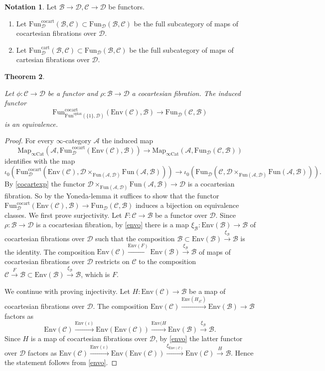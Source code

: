 \documentclass[10pt,oneside]{article}
\numberwithin{equation}{section} %
\numberwithin{figure}{section} %
\theoremstyle{plain}
\newtheorem{theorem}{Theorem}[subsection]
\theoremstyle{definition}
\newtheorem{notation}[theorem]{Notation}
\newcommand{\mA}{{\mathcal A}}
\newcommand{\mB}{{\mathcal B}}
\newcommand{\mC}{{\mathcal C}}
\newcommand{\mD}{{\mathcal D}}
\newcommand{\Env}{{\mathrm{Env}}}
\newcommand{\Cat}{\mathrm{Cat}}
\newcommand{\Fun}{\mathrm{Fun}}
\newcommand{\cocart}{{\mathrm{cocart}}}
\newcommand{\cart}{{\mathrm{cart}}}
\newcommand{\oplax}{{\mathrm{oplax}}}
\newcommand{\Map}{{\mathrm{Map}}}
\begin{document}
\begin{notation}

Let $\mB \to \mD, \mC \to \mD$ be functors.
\begin{enumerate}[\normalfont(1)]\setlength{\itemsep}{-2pt}

\item Let $\Fun_\mD^\cocart(\mB,\mC) \subset \Fun_\mD(\mB,\mC) $
be the full subcategory of maps of cocartesian fibrations over $\mD.$

\item Let $\Fun_\mD^\cart(\mB,\mC) \subset \Fun_\mD(\mB,\mC) $
be the full subcategory of maps of cartesian fibrations over $\mD.$

\end{enumerate}

\end{notation}

\begin{theorem}\label{envelo}

Let $\phi: \mC \to \mD $ be a functor and
$\rho: \mB \to \mD $ a cocartesian fibration.
The induced functor
$$ \Fun^\cocart_{\Fun^\oplax(\{1\},\mD)}(\Env(\mC),\mB) \to \Fun_\mD(\mC,\mB) $$
is an equivalence.

\end{theorem}

\begin{proof}

For every $\infty$-category $\mA$ the induced map
$$ \Map_{\infty\Cat}(\mA,\Fun^{\cocart}_\mD(\Env(\mC),\mB)) \to \Map_{\infty\Cat}(\mA, \Fun_\mD(\mC,\mB))$$ identifies with the map
$$ \iota_0(\Fun^{\cocart}_\mD(\Env(\mC), \mD \times_{\Fun(\mA,\mD)}\Fun(\mA,\mB))) \to \iota_0(\Fun_\mD(\mC,\mD \times_{\Fun(\mA,\mD)}\Fun(\mA,\mB))).$$
By \cref{cocartexp} the functor $\mD \times_{\Fun(\mA,\mD)}\Fun(\mA,\mB) \to \mD$ is a cocartesian fibration.
So by the Yoneda-lemma it suffices to show that 
the functor $ \Fun^\cocart_\mD(\Env(\mC),\mB) \to \Fun_\mD(\mC,\mB) $ induces a bijection on equivalence classes.
We first prove surjectivity.
Let $F: \mC \to \mB$ be a functor over $\mD.$
Since $\rho: \mB \to \mD$ is a cocartesian fibration,
by \cref{envo} there is a map $\xi_\mB: \Env(\mB) \to \mB$ of cocartesian fibrations over $\mD$ such that the composition
$\mB \subset \Env(\mB) \xrightarrow{\xi_\mB} \mB$ is the identity.
The composition $\Env(\mC) \xrightarrow{\Env(F)} \Env(\mB) \xrightarrow{\xi_\mB} \mB$ of maps of cocartesian fibrations over $\mD$
restricts on $\mC$ to the composition 
$\mC \xrightarrow{F} \mB \subset \Env(\mB) \xrightarrow{\xi_\mB} \mB$, which is $F.$

We continue with proving injectivity.
Let $H: \Env(\mC) \to \mB$ be a map of cocartesian fibrations over $\mD.$
The composition $\Env(\mC) \xrightarrow{\Env(H_{\mid \mC})} \Env(\mB) \to \mB $ 
factors as $$\Env(\mC) \xrightarrow{\Env(\iota)} \Env(\Env(\mC)) \xrightarrow{\Env(H} \Env(\mB) \xrightarrow{\xi_\mB} \mB.$$
Since $H$ is a map of cocartesian fibrations over $\mD$, by \cref{envo} the latter functor over $\mD$ factors as 
$\Env(\mC) \xrightarrow{\Env(\iota)} \Env(\Env(\mC)) \xrightarrow{\xi_{\Env(\mC)}} \Env(\mC) \xrightarrow{H} \mB $.
Hence the statement follows from \cref{envo}.
\end{proof}
\end{document}
